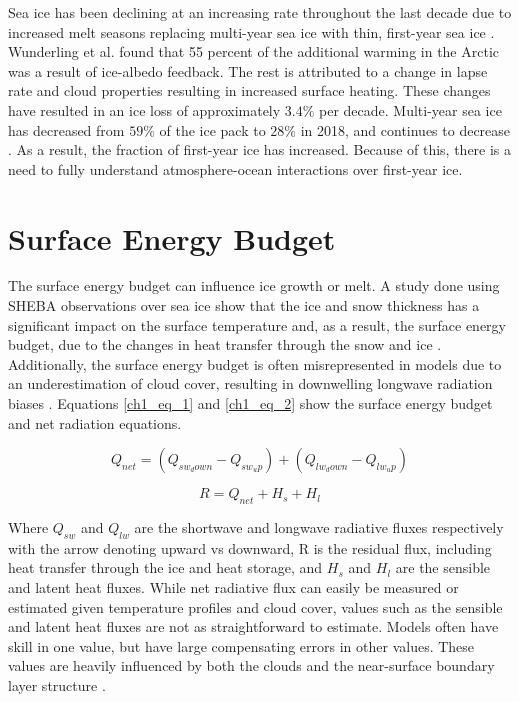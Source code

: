 Sea ice has been declining at an increasing rate throughout the last decade due to increased melt seasons replacing multi-year sea ice with thin, first-year sea ice \cite{meier:2014}. Wunderling et al. \cite{wunderling:2020} found that 55 percent of the additional warming in the Arctic was a result of ice-albedo feedback. The rest is attributed to a change in lapse rate and cloud properties resulting in increased surface heating. These changes have resulted in an ice loss of approximately $3.4 \%$ per decade. Multi-year sea ice has decreased from $59 \%$ of the ice pack to $28 \%$ in 2018, and continues to decrease \cite{stroeve:2018}. As a result, the fraction of first-year ice has increased.  Because of this, there is a need to fully understand atmosphere-ocean interactions over first-year ice. 

\section{Surface Energy Budget}
The surface energy budget can influence ice growth or melt. A study done using SHEBA observations over sea ice show that the ice and snow thickness has a significant impact on the surface temperature and, as a result, the surface energy budget, due to the changes in heat transfer through the snow and ice \cite{hines:2015}. Additionally, the surface energy budget is often misrepresented in models due to an underestimation of cloud cover, resulting in downwelling longwave radiation biases \cite{inoue:2008}. Equations \ref{ch1_eq_1} and \ref{ch1_eq_2} show the surface energy budget and net radiation equations.

\begin{equation}\label{ch1_eq_1}
Q_{net} = (Q_{sw_down} - Q_{sw_up}) + (Q_{lw_down} - Q_{lw_up})
\end{equation}

\begin{equation}\label{ch1_eq_2}
R = Q_{net} + H_{s} + H_{l}
\end{equation}

Where $Q_{sw}$ and $Q_{lw}$ are the shortwave and longwave radiative fluxes respectively with the arrow denoting upward vs downward, R is the residual flux, including heat transfer through the ice and heat storage, and $H_{s}$ and $H_{l}$ are the sensible and latent heat fluxes. While net radiative flux can easily be measured or estimated given temperature profiles and cloud cover, values such as the sensible and latent heat fluxes are not as straightforward to estimate. Models often have skill in one value, but have large compensating errors in other values. These values are heavily influenced by both the clouds and the near-surface boundary layer structure \cite{tjernstrom:2005}.

